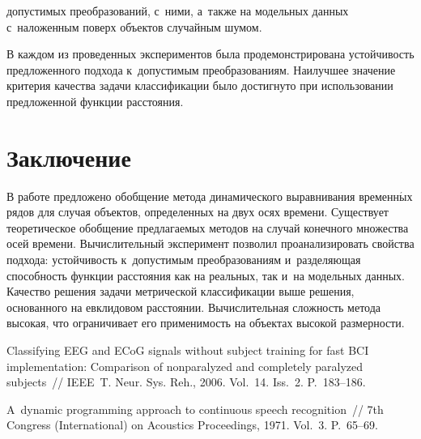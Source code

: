\begin{multicols}{2}

\noindent допустимых преобразований, с~ними, а~также 
на модельных данных с~наложенным поверх объектов случайным шумом.



В каждом из проведенных экспериментов была продемонстрирована 
устойчивость предложенного подхода к~допустимым преобразованиям. 
Наилучшее значение критерия качества задачи классификации было 
достигнуто при использовании предложенной функции расстояния.

\vspace*{-5pt}

\section{Заключение}

В работе предложено обобщение метода динамического выравнивания
 временн$\acute{\mbox{ы}}$х рядов для случая объектов, определенных на двух осях времени. 
 Существует теоретическое обобщение предлагаемых методов на случай 
 конечного множества осей времени. Вычислительный эксперимент позволил 
 проанализировать свойства подхода: устойчивость к~допустимым 
 преобразованиям и~разделяющая способность функции расстояния как 
 на реальных, так и~на модельных данных. Качество решения задачи 
 метрической классификации выше решения, основанного на евклидовом 
 расстоянии. Вычислительная сложность метода высокая, что ограничивает 
 его применимость на объектах высокой размерности.

\vspace*{-2pt}

{\small\frenchspacing
 {%
 \begin{thebibliography}{99}

 Classifying EEG and 
ECoG signals without subject training for fast BCI implementation: 
Comparison of nonparalyzed and completely paralyzed subjects~//  
IEEE~T. Neur. Sys. Reh., 2006. Vol.~14. 
Iss.~2. P.~183--186.

A~dynamic programming approach to continuous speech recognition~// 
7th  Congress (International) on Acoustics Proceedings, 1971. Vol.~3. P.~65--69.


\end{thebibliography}}}
\end{multicols}
